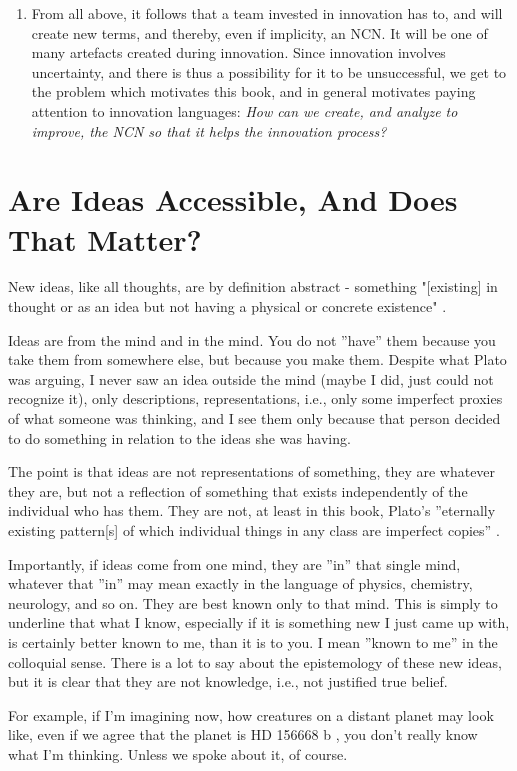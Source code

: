 \documentclass[graybox,envcountchap,sectrefs]{svmono}
\newcommand{\ncn}{NCN}
\begin{document}
\begin{enumerate}
	\item From all above, it follows that a team invested in innovation has to, and will create new terms, and thereby, even if implicity, an \ncn. It will be one of many artefacts created during innovation. Since innovation involves uncertainty, and there is thus a possibility for it to be unsuccessful, we get to the problem which motivates this book, and in general motivates paying attention to innovation languages: \textit{How can we create, and analyze to improve, the \ncn{} so that it helps the innovation process?}
\end{enumerate}

\section{Are Ideas Accessible, And Does That Matter?}
\label{c1-s6}
New ideas, like all thoughts, are by definition abstract - something "[existing] in thought or as an idea but not having a physical or concrete existence" \cite{def-abstract}.

Ideas are from the mind and in the mind. You do not ''have'' them because you take them from somewhere else, but because you make them. Despite what Plato was arguing, I never saw an idea outside the mind (maybe I did, just could not recognize it), only descriptions, representations, i.e., only some imperfect proxies of what someone was thinking, and I see them only because that person decided to do something in relation to the ideas she was having.

The point is that ideas are not representations of something, they are whatever they are, but not a reflection of something that exists independently of the individual who has them. They are not, at least in this book, Plato's ''eternally existing pattern[s] of which individual things in any class are imperfect copies'' \cite{def-idea,Kraut2017}. 

Importantly, if ideas come from one mind, they are ''in'' that single mind, whatever that ''in'' may mean exactly in the language of physics, chemistry, neurology, and so on. They are best known only to that mind. This is simply to underline that what I know, especially if it is something new I just came up with, is certainly better known to me, than it is to you. I mean ''known to me'' in the colloquial sense. There is a lot to say about the epistemology of these new ideas, but it is clear that they are not knowledge, i.e., not justified true belief.

For example, if I'm imagining now, how creatures on a distant planet may look like, even if we agree that the planet is HD 156668 b \cite{wikipedia-hd156668b}, you don't really know what I'm thinking. Unless we spoke about it, of course.
\end{document}
